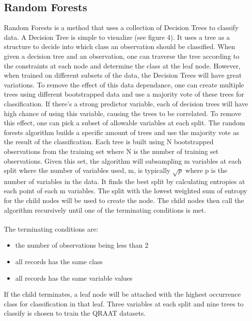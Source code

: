 \documentclass[twoside]{article}
\begin{document}
\subsection{Random Forests}
Random Forests is a method that uses a collection of Decision Trees to classify data. A Decision Tree is simple to visualize (see figure 4). It uses a tree as a structure to decide into which class an observation should be classified. When given a decision tree and an observation, one can traverse the tree according to the constraints at each node and determine the class at the leaf node. However, when trained on different subsets of the data, the Decision Trees will have great variations. To remove the effect of this data dependance, one can create multiple trees using different bootstrapped data and use a majority vote of these trees for classification. If there's a strong predictor variable, each of decision trees will have high chance of using this variable, causing the trees to be correlated. To remove this effect, one can pick a subset of allowable variables at each split. The random forests algorithm builds a specific amount of trees and use the majority vote as the result of the classification. Each tree is built using N bootstrapped observations from the training set where N is the number of training set observations. Given this set, the algorithm will subsampling m variables at each split where the number of variables used, m, is typically $\sqrt{p}$ where p is the number of variables in the data. It finds the best split by calculating entropies at each point of each m variables. The split with the lowest weighted sum of entropy for the child nodes will be used to create the node. The child nodes then call the algorithm recursively until one of the terminating conditions is met. 
\\\\The terminating conditions are:
\begin{itemize}
\item the number of observations being less than 2
\item all records has the same class
\item all records has the same variable values
\end{itemize}
If the child terminates, a leaf node will be attached with the highest occurrence class for classification in that leaf. Three variables at each split and nine trees to classify is chosen to train the QRAAT datasets.
\end{document}
